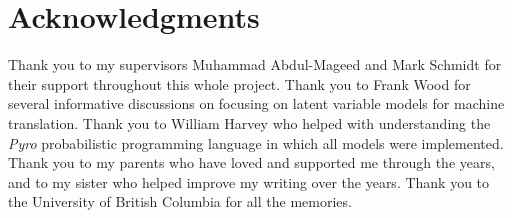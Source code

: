 
\chapter{Acknowledgments}




Thank you to my supervisors Muhammad Abdul-Mageed and Mark Schmidt for their support throughout this whole project. Thank you to Frank Wood for several informative discussions on focusing on  latent variable models for machine translation. Thank you to William Harvey who helped with understanding the \textit{Pyro} probabilistic programming language in which all models were implemented. Thank you to my parents who have loved and supported me through the years, and to my sister who helped improve my writing over the years. Thank you to the University of British Columbia for all the memories. 